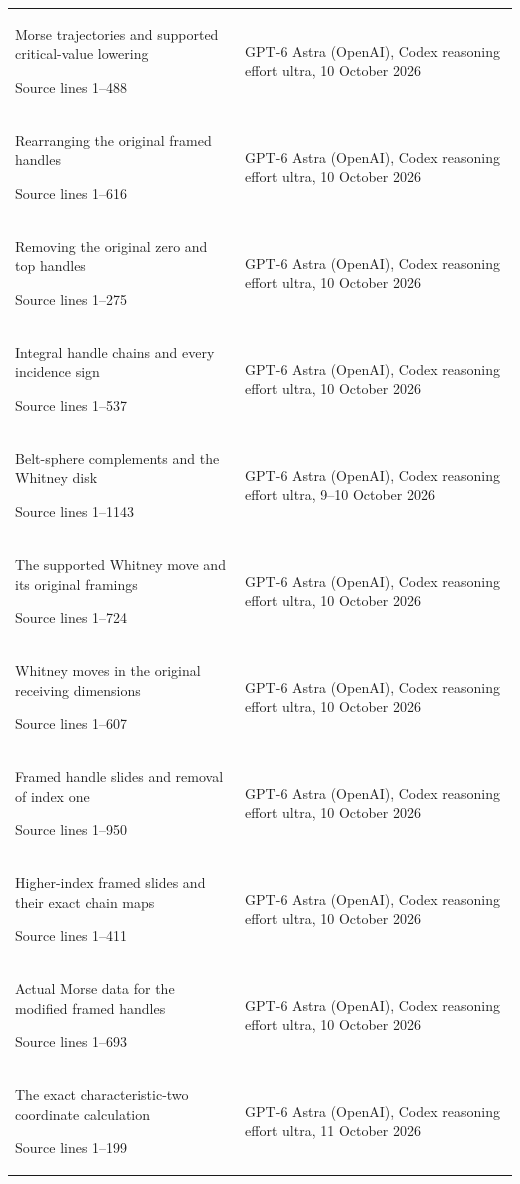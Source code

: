 \begin{longtable}{@{}p{61mm}p{87mm}@{}}
Morse trajectories and supported critical-value lowering\par Source lines 1–488 & GPT-6 Astra (OpenAI),\allowbreak{} Codex reasoning effort ultra,\allowbreak{} 10 October 2026\\
Rearranging the original framed handles\par Source lines 1–616 & GPT-6 Astra (OpenAI),\allowbreak{} Codex reasoning effort ultra,\allowbreak{} 10 October 2026\\
Removing the original zero and top handles\par Source lines 1–275 & GPT-6 Astra (OpenAI),\allowbreak{} Codex reasoning effort ultra,\allowbreak{} 10 October 2026\\
Integral handle chains and every incidence sign\par Source lines 1–537 & GPT-6 Astra (OpenAI),\allowbreak{} Codex reasoning effort ultra,\allowbreak{} 10 October 2026\\
Belt-sphere complements and the Whitney disk\par Source lines 1–1143 & GPT-6 Astra (OpenAI),\allowbreak{} Codex reasoning effort ultra,\allowbreak{} 9–10 October 2026\\
The supported Whitney move and its original framings\par Source lines 1–724 & GPT-6 Astra (OpenAI),\allowbreak{} Codex reasoning effort ultra,\allowbreak{} 10 October 2026\\
Whitney moves in the original receiving dimensions\par Source lines 1–607 & GPT-6 Astra (OpenAI),\allowbreak{} Codex reasoning effort ultra,\allowbreak{} 10 October 2026\\
Framed handle slides and removal of index one\par Source lines 1–950 & GPT-6 Astra (OpenAI),\allowbreak{} Codex reasoning effort ultra,\allowbreak{} 10 October 2026\\
Higher-index framed slides and their exact chain maps\par Source lines 1–411 & GPT-6 Astra (OpenAI),\allowbreak{} Codex reasoning effort ultra,\allowbreak{} 10 October 2026\\
Actual Morse data for the modified framed handles\par Source lines 1–693 & GPT-6 Astra (OpenAI),\allowbreak{} Codex reasoning effort ultra,\allowbreak{} 10 October 2026\\
The exact characteristic-two coordinate calculation\par Source lines 1–199 & GPT-6 Astra (OpenAI),\allowbreak{} Codex reasoning effort ultra,\allowbreak{} 11 October 2026\\

\end{longtable}
